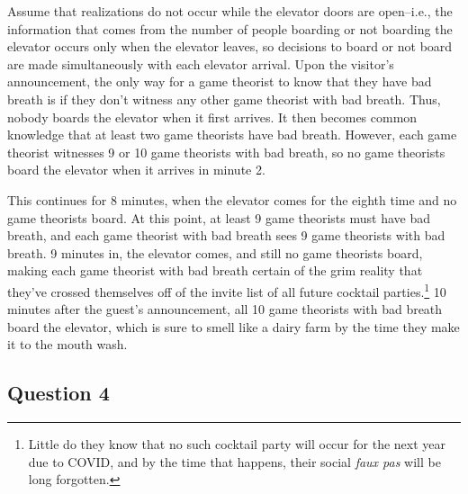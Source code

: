 \documentclass{article}
\begin{document}
Assume that realizations do not occur while the elevator doors are open--i.e., the information that comes from the number of people boarding or not boarding the elevator occurs only when the elevator leaves, so decisions to board or not board are made simultaneously with each elevator arrival. Upon the visitor's announcement, the only way for a game theorist to know that they have bad breath is if they don't witness any other game theorist with bad breath. Thus, nobody boards the elevator when it first arrives. It then becomes common knowledge that at least two game theorists have bad breath. However, each game theorist witnesses 9 or 10 game theorists with bad breath, so no game theorists board the elevator when it arrives in minute 2. 

This continues for 8 minutes, when the elevator comes for the eighth time and no game theorists board. At this point, at least 9 game theorists must have bad breath, and each game theorist with bad breath sees 9 game theorists with bad breath. 9 minutes in, the elevator comes, and still no game theorists board, making each game theorist with bad breath certain of the grim reality that they've crossed themselves off of the invite list of all future cocktail parties.\footnote{Little do they know that no such cocktail party will occur for the next year due to COVID, and by the time that happens, their social \textit{faux pas} will be long forgotten.} 10 minutes after the guest's announcement, all 10 game theorists with bad breath board the elevator, which is sure to smell like a dairy farm by the time they make it to the mouth wash.



\subsection*{Question 4}
\end{document}

